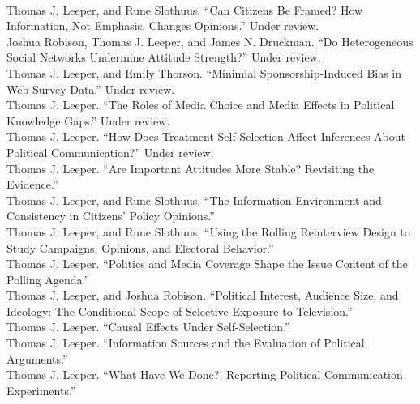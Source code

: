\documentclass[12pt]{article}
\newcommand{\topic}[1]{\pagebreak[3]\indent {\color{lg}{\footnotesize #1 }}\\}
\newcommand{\entry}[1]{\indent {\color{lg}\guillemotright}\hspace{2pt}#1\vspace{.25em}\\}
\begin{document}
\topic{Working Papers and Papers Under Review}
\entry{Thomas J. Leeper, and Rune Slothuus. ``Can Citizens Be Framed? How Information, Not Emphasis, Changes Opinions.'' Under review.}
\entry{Joshua Robison, Thomas J. Leeper, and James N. Druckman. ``Do Heterogeneous Social Networks Undermine Attitude Strength?'' Under review.}
\entry{Thomas J. Leeper, and Emily Thorson. ``Minimial Sponsorship-Induced Bias in Web Survey Data.'' Under review.}
\entry{Thomas J. Leeper. ``The Roles of Media Choice and Media Effects in Political Knowledge Gaps.'' Under review.}
\entry{Thomas J. Leeper. ``How Does Treatment Self-Selection Affect Inferences About Political Communication?'' Under review.}
\entry{Thomas J. Leeper. ``Are Important Attitudes More Stable? Revisiting the Evidence.''}
\entry{Thomas J. Leeper, and Rune Slothuus. ``The Information Environment and Consistency in Citizens' Policy Opinions.''}
\entry{Thomas J. Leeper, and Rune Slothuus. ``Using the Rolling Reinterview Design to Study Campaigns, Opinions, and Electoral Behavior.''}
\entry{Thomas J. Leeper. ``Politics and Media Coverage Shape the Issue Content of the Polling Agenda.''}
\entry{Thomas J. Leeper, and Joshua Robison. ``Political Interest, Audience Size, and Ideology: The Conditional Scope of Selective Exposure to Television.''}
\entry{Thomas J. Leeper. ``Causal Effects Under Self-Selection.''}
\entry{Thomas J. Leeper. ``Information Sources and the Evaluation of Political Arguments.''}
\entry{Thomas J. Leeper. ``What Have We Done?! Reporting Political Communication Experiments.''}
\end{document}
